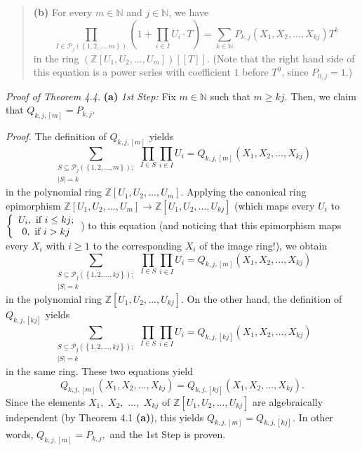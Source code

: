 \documentclass[numbers=enddot,12pt,final,onecolumn,notitlepage]{scrartcl}%
\begin{document}
\begin{quote}
\textbf{(b)} For every $m\in\mathbb{N}$ and $j\in\mathbb{N}$, we have%
\begin{equation}
\prod_{I\in\mathcal{P}_{j}\left(  \left\{  1,2,...,m\right\}  \right)
}\left(  1+\prod_{i\in I}U_{i}\cdot T\right)  =\sum_{k\in\mathbb{N}}%
P_{k,j}\left(  X_{1},X_{2},...,X_{kj}\right)  T^{k} \label{Pkj2}%
\end{equation}
in the ring $\left(  \mathbb{Z}\left[  U_{1},U_{2},...,U_{m}\right]  \right)
\left[  \left[  T\right]  \right]  $. (Note that the right hand side of this
equation is a power series with coefficient $1$ before $T^{0}$, since
$P_{0,j}=1$.)
\end{quote}

\textit{Proof of Theorem 4.4.} \textbf{(a)} \textit{1st Step:} Fix
$m\in\mathbb{N}$ such that $m\geq kj$. Then, we claim that $Q_{k,j,\left[
m\right]  }=P_{k,j}$.

\textit{Proof.} The definition of $Q_{k,j,\left[  m\right]  }$ yields
\[
\sum_{\substack{S\subseteq\mathcal{P}_{j}\left(  \left\{  1,2,...,m\right\}
\right)  ;\\\left\vert S\right\vert =k}}\prod_{I\in S}\prod_{i\in I}%
U_{i}=Q_{k,j,\left[  m\right]  }\left(  X_{1},X_{2},...,X_{kj}\right)
\]
in the polynomial ring $\mathbb{Z}\left[  U_{1},U_{2},...,U_{m}\right]  $.
Applying the canonical ring epimorphism $\mathbb{Z}\left[  U_{1}%
,U_{2},...,U_{m}\right]  \rightarrow\mathbb{Z}\left[  U_{1},U_{2}%
,...,U_{kj}\right]  $ (which maps every $U_{i}$ to $\left\{
\begin{array}
[c]{c}%
U_{i},\text{ if }i\leq kj;\\
0,\text{ if }i>kj
\end{array}
\right.  $) to this equation (and noticing that this epimorphism maps every
$X_{i}$ with $i\geq1$ to the corresponding $X_{i}$ of the image ring!), we
obtain%
\[
\sum_{\substack{S\subseteq\mathcal{P}_{j}\left(  \left\{  1,2,...,kj\right\}
\right)  ;\\\left\vert S\right\vert =k}}\prod_{I\in S}\prod_{i\in I}%
U_{i}=Q_{k,j,\left[  m\right]  }\left(  X_{1},X_{2},...,X_{kj}\right)
\]
in the polynomial ring $\mathbb{Z}\left[  U_{1},U_{2},...,U_{kj}\right]  $. On
the other hand, the definition of $Q_{k,j,\left[  kj\right]  }$ yields%
\[
\sum_{\substack{S\subseteq\mathcal{P}_{j}\left(  \left\{  1,2,...,kj\right\}
\right)  ;\\\left\vert S\right\vert =k}}\prod_{I\in S}\prod_{i\in I}%
U_{i}=Q_{k,j,\left[  kj\right]  }\left(  X_{1},X_{2},...,X_{kj}\right)
\]
in the same ring. These two equations yield%
\[
Q_{k,j,\left[  m\right]  }\left(  X_{1},X_{2},...,X_{kj}\right)
=Q_{k,j,\left[  kj\right]  }\left(  X_{1},X_{2},...,X_{kj}\right)  .
\]
Since the elements $X_{1},$ $X_{2},$ $...,$ $X_{kj}$ of $\mathbb{Z}\left[
U_{1},U_{2},...,U_{kj}\right]  $ are algebraically independent (by Theorem 4.1
\textbf{(a)}), this yields $Q_{k,j,\left[  m\right]  }=Q_{k,j,\left[
kj\right]  }.$ In other words, $Q_{k,j,\left[  m\right]  }=P_{k,j},$ and the
1st Step is proven.
\end{document}
